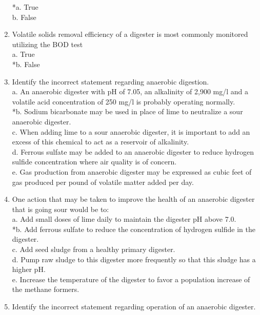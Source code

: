 \begin{enumerate}
*a. True \\
b. False \\

\item  Volatile solids removal efficiency of a digester is most commonly monitored utilizing the BOD test \\

a. True \\
*b. False \\

\item  Identify the incorrect statement regarding anaerobic digestion. \\

a. An anaerobic digester with pH of 7.05, an alkalinity of 2,900 mg/l and a volatile acid concentration of 250 mg/l is probably operating normally. \\
*b. Sodium bicarbonate may be used in place of lime to neutralize a sour anaerobic digester. \\
c. When adding lime to a sour anaerobic digester, it is important to add an excess of this chemical to act as a reservoir of alkalinity. \\
d. Ferrous sulfate may be added to an anaerobic digester to reduce hydrogen sulfide concentration where air quality is of concern. \\
e. Gas production from anaerobic digester may be expressed as cubic feet of gas produced per pound of volatile matter added per day. \\

\item  One action that may be taken to improve the health of an anaerobic digester that is going sour would be to: \\

a. Add small doses of lime daily to maintain the digester pH above 7.0. \\
*b. Add ferrous sulfate to reduce the concentration of hydrogen sulfide in the digester. \\
c. Add seed sludge from a healthy primary digester. \\
d. Pump raw sludge to this digester more frequently so that this sludge has a higher pH. \\
e. Increase the temperature of the digester to favor a population increase of the methane formers. \\

\item  Identify the incorrect statement regarding operation of an anaerobic digester. \\


\end{enumerate}

